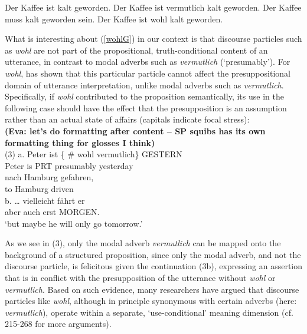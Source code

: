 \documentclass[11pt]{article}
\begin{document}
\begin{exe}
	\ex\label{german} \begin{xlist}
		\ex\label{bareG} Der Kaffee ist kalt geworden.
		\ex\label{probG} Der Kaffee ist vermutlich kalt geworden.
		\ex\label{mustG} Der Kaffee muss kalt geworden sein. 
		\ex\label{wohlG} Der Kaffee ist wohl kalt geworden.
	\end{xlist}
\end{exe}

What is interesting about (\ref{wohlG}) in our context is that discourse particles such as \emph{wohl} are not part of the propositional, truth-conditional content of an utterance, in contrast to modal adverbs such as \emph{vermutlich} (`presumably'). For \emph{wohl}, \cite{Zimmermann2004, Zimmermann2008} has shown that this particular particle cannot affect the presuppositional domain of utterance interpretation, unlike modal adverbs such as \emph{vermutlich}. Specifically, if \emph{wohl} contributed to the proposition semantically, its use in the following case should have the effect that the presupposition is an assumption rather than an actual state of affairs (capitals indicate focal stress):\\\textbf{
(Eva: let's do formatting after content -- SP squibs has its own formatting thing for glosses I think)}\\
(3)	a.	Peter	ist	\{ \#	wohl  	vermutlich\}	GESTERN	\\
		Peter	is		PRT     presumably	yesterday\\
			
		
		nach	 Hamburg	 gefahren,	\\
		to	 Hamburg	 driven	\\		
	b.	… vielleicht fährt er		\\
		aber	auch erst MORGEN.\\
		‘but maybe he will only go 
		tomorrow.’
	
	
	
As we see in (3), only the modal adverb \emph{vermutlich} can be mapped onto the background of a structured proposition, since only the modal adverb, and not the discourse particle, is felicitous given the continuation (3b), expressing an assertion that is in conflict with the presupposition of the utterance without \emph{wohl} or \emph{vermutlich}. Based on such evidence, many researchers have argued that discourse particles like \emph{wohl}, although in principle synonymous with certain adverbs (here: \emph{vermutlich}), operate within a separate, `use-conditional' meaning dimension (cf. \cite{Gutzmann2015} 215-268 for more arguments).
	
\end{document}
